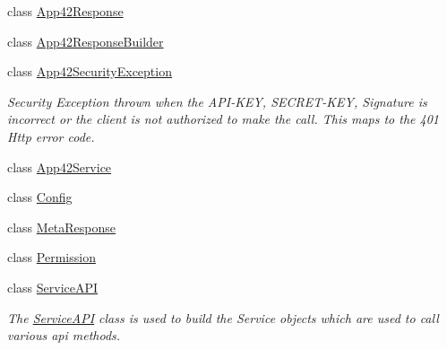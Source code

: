 \begin{DoxyCompactItemize}
class \hyperlink{classcom_1_1shephertz_1_1app42_1_1paas_1_1sdk_1_1csharp_1_1_app42_response}{App42\+Response}
\item 
class \hyperlink{classcom_1_1shephertz_1_1app42_1_1paas_1_1sdk_1_1csharp_1_1_app42_response_builder}{App42\+Response\+Builder}
\item 
class \hyperlink{classcom_1_1shephertz_1_1app42_1_1paas_1_1sdk_1_1csharp_1_1_app42_security_exception}{App42\+Security\+Exception}
\begin{DoxyCompactList}\small\item\em Security Exception thrown when the A\+P\+I-\/\+K\+E\+Y, S\+E\+C\+R\+E\+T-\/\+K\+E\+Y, Signature is incorrect or the client is not authorized to make the call. This maps to the 401 Http error code. \end{DoxyCompactList}\item 
class \hyperlink{classcom_1_1shephertz_1_1app42_1_1paas_1_1sdk_1_1csharp_1_1_app42_service}{App42\+Service}
\item 
class \hyperlink{classcom_1_1shephertz_1_1app42_1_1paas_1_1sdk_1_1csharp_1_1_config}{Config}
\item 
class \hyperlink{classcom_1_1shephertz_1_1app42_1_1paas_1_1sdk_1_1csharp_1_1_meta_response}{Meta\+Response}
\item 
class \hyperlink{classcom_1_1shephertz_1_1app42_1_1paas_1_1sdk_1_1csharp_1_1_permission}{Permission}
\item 
class \hyperlink{classcom_1_1shephertz_1_1app42_1_1paas_1_1sdk_1_1csharp_1_1_service_a_p_i}{Service\+A\+P\+I}
\begin{DoxyCompactList}\small\item\em The \hyperlink{classcom_1_1shephertz_1_1app42_1_1paas_1_1sdk_1_1csharp_1_1_service_a_p_i}{Service\+A\+P\+I} class is used to build the Service objects which are used to call various api methods. \end{DoxyCompactList}\end{DoxyCompactItemize}
